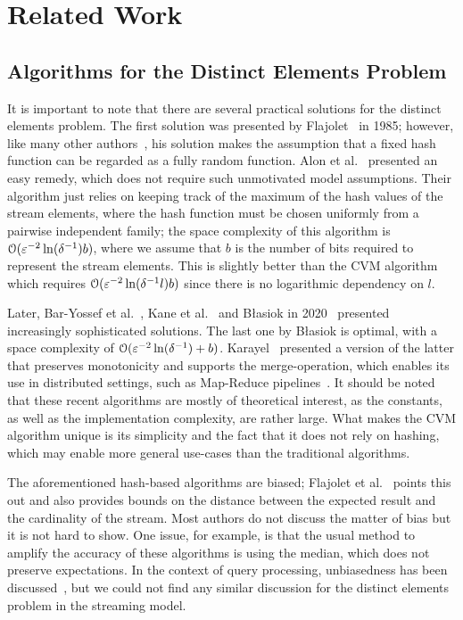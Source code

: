 \section{Related Work}\label{sec:related_work}
\subsection{Algorithms for the Distinct Elements Problem}
It is important to note that there are several practical solutions for the distinct elements problem.
The first solution was presented by Flajolet~\cite{flajolet1985} in 1985; however, like many other authors~\cite{flajolet2007,heule2013,pettie2021}, his solution makes the assumption that a fixed hash function can be regarded as a fully random function.
Alon et al.~\cite[Section 2.3]{alon1999} presented an easy remedy, which does not require such unmotivated model assumptions.
Their algorithm just relies on keeping track of the maximum of the hash values of the stream elements, where the hash function must be chosen uniformly from a pairwise independent family; the space complexity of this algorithm is $\operatorname{\mathcal O}(\varepsilon^{-2} \ln (\delta^{-1}) b)$, where we assume that $b$ is the number of bits required to represent the stream elements.
This is slightly better than the CVM algorithm which requires $\operatorname{\mathcal O}(\varepsilon^{-2} \ln (\delta^{-1}l) b)$ since there is no logarithmic dependency on $l$.

Later, Bar-Yossef et al.~\cite{baryossef2002}, Kane et al.~\cite{kane2010} and B\l{}asiok in 2020~\cite{blasiok2020} presented increasingly sophisticated solutions.
The last one by B\l{}asiok is optimal, with a space complexity of $\operatorname{\mathcal O}(\varepsilon^{-2} \ln (\delta^{-1}) + b)$.
Karayel~\cite{karayel2023} presented a version of the latter that preserves monotonicity and supports the merge-operation, which enables its use in distributed settings, such as Map-Reduce pipelines~\cite{dean2010}.
It should be noted that these recent algorithms are mostly of theoretical interest, as the constants, as well as the implementation complexity, are rather large.
What makes the CVM algorithm unique is its simplicity and the fact that it does not rely on hashing, which may enable more general use-cases than the traditional algorithms.

The aforementioned hash-based algorithms are biased; Flajolet et al.~\cite{flajolet1985} points this out and also provides bounds on the distance between the expected result and the cardinality of the stream.
Most authors do not discuss the matter of bias but it is not hard to show.
One issue, for example, is that the usual method to amplify the accuracy of these algorithms is using the median, which does not preserve expectations.
In the context of query processing, unbiasedness has been discussed~\cite[Section 2.1]{haas1995}, but we could not find any similar discussion for the distinct elements problem in the streaming model.

